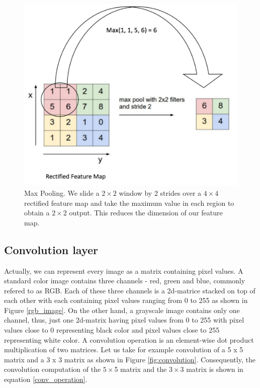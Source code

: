 \documentclass[master]{thesis-uestc}
\begin{document}
\begin{figure}[ht]
\includegraphics[width=5in]{pic/pooling.png}
\caption{Max Pooling. We slide a $2 \times 2$ window by 2 strides over a $4 \times 4$ rectified feature map and take the maximum value in each region to obtain a $2 \times 2$ output. This reduces the dimension of our feature map.}
\label{fig_maxpooling}
\end{figure}

\subsection{Convolution layer}
Actually, we can represent every image as a matrix containing pixel values. A standard color image contains three channels - red, green and blue, commonly refered to as RGB. Each of these three channels is a 2d-matrice stacked on top of each other with each containing pixel values ranging from 0 to 255 as shown in Figure \ref{rgb_image}. On the other hand, a grayscale image contains only one channel, thus, just one 2d-matrix having pixel values from 0 to 255 with pixel values close to 0 representing black color and pixel values close to 255 representing white color. A convolution operation is an element-wise dot product multiplication of two matrices. Let us take for example convolution of a 5 x 5 matrix and a 3 x 3 matrix as shown in Figure \ref{fig:convolution}. Consequently, the convolution computation of the $5 \times $5 matrix and the $3 \times $3 matrix is shown in equation \ref{conv_operation}.
\end{document}
